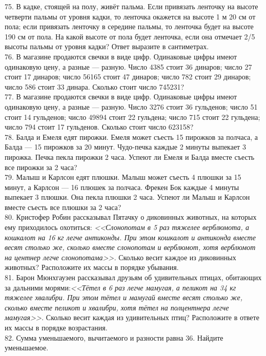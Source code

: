 \documentclass[12pt]{article}
\begin{document}
75. В кадке, стоящей на полу, живёт пальма. Если привязать ленточку на высоте четверти пальмы от уровня кадки, то ленточка окажется на высоте 1 м 20 см от пола; если привязать ленточку в середине пальмы, то ленточка будет на высоте 190 см от пола. На какой высоте от пола будет ленточка, если она отмечает 2/5 высоты пальмы от уровня кадки? Ответ выразите в сантиметрах.\\
76. В магазине продаются свечки в виде цифр. Одинаковые цифры имеют одинаковую цену, а разные --- разную. Число 4385 стоит 36 динаров; число 27 стоит 17 динаров; число 56165 стоит 47 динаров; число 782 стоит 29 динаров; число 586 стоит 33 динара. Сколько стоит число 745231?\\
77. В магазине продаются свечки в виде цифр. Одинаковые цифры имеют одинаковую цену, а разные --- разную. Число 3276 стоит 36 гульденов; число 51 стоит 14 гульденов; число 49894 стоит 22 гульдена; число 715 стоит 22 гульдена; число 794 стоит 17 гульденов. Сколько стоит число 623158?\\
78. Балда и Емеля едят пирожки. Емеля может съесть 15 пирожков за полчаса, а Балда --- 15 пирожков за 20 минут. Чудо-печка каждые 2 минуты выпекает 3 пирожка. Печка пекла пирожки 2 часа. Успеют ли Емеля и Балда вместе съесть все пирожки за 2 часа?\\
79. Малыш и Карлсон едят плюшки. Малыш может съесть 4 плюшки за 15 минут, а Карлсон --- 16 плюшек за полчаса. Фрекен Бок каждые 4 минуты выпекает 3 плюшки. Она пекла плюшки 2 часа. Успеют ли Малыш и Карлсон вместе съесть все плюшки за 2 часа?\\
80. Кристофер Робин рассказывал Пятачку о диковинных животных, на которых ему приходилось охотиться: {\it <<Слонопотам в 5 раз тяжелее верблюмота, а кошкалот на 16 кг легче антиконды. При этом кошкалот и антиконда вместе весят столько же, сколько вместе слонопотам и верблюмот, хотя верблюмот на центнер легче слонопотама>>.} Сколько весит каждое из диковинных животных? Расположите их массы в порядке убывания.\\
81. Барон Мюнхгаузен рассказывал друзьям об удивительных птицах, обитающих за дальними морями:{\it <<Тётел в 6 раз легче мамугая, а пеликот на 34 кг тяжелее хвалибри. При этом тётел и мамугай вместе весят столько же, сколько вместе пеликот и хвалибри, хотя тётел на полцентнера легче мамугая>>.} Сколько весит каждая из удивительных птиц? Расположите в ответе их массы в порядке возрастания.\\
82. Сумма уменьшаемого, вычитаемого и разности равна 36. Найдите уменьшаемое.\\
\end{document}
